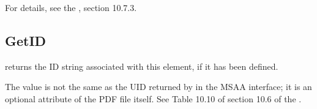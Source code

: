 \documentclass[letterpaper,12pt,english,openany,oneside]{sphinxmanual}
\begin{document}
\begin{sphinxVerbatim}[commandchars=\\\{\}]
                                    
\end{sphinxVerbatim}

For details, see the  , section 10.7.3.

\begin{sphinxVerbatim}[commandchars=\\\{\}]
   
\end{sphinxVerbatim}




\subsection{GetID}
\label{\detokenize{Access_DOM:getid}}
 returns the ID string associated with this element, if it has been defined.

The  value is not the same as the UID returned by  in the MSAA interface; it is an optional attribute of the PDF file itself. See Table 10.10 of section 10.6 of the  .

\begin{sphinxVerbatim}[commandchars=\\\{\}]
   
\end{sphinxVerbatim}
\end{document}
